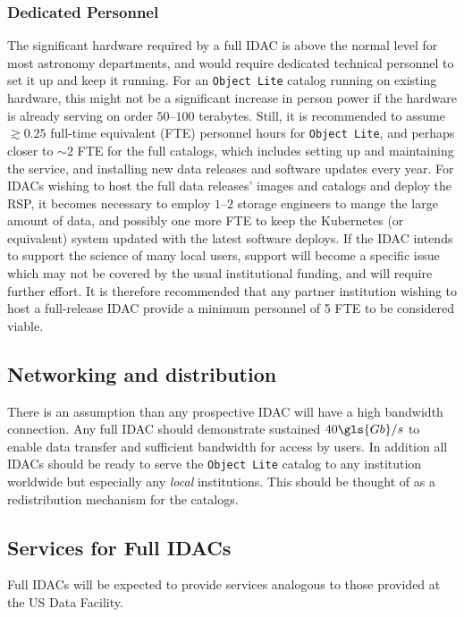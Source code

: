 \subsubsection{Dedicated Personnel}
The significant hardware required by a full  \gls{IDAC} is above the normal level for most astronomy departments, and would require dedicated technical personnel to set it up and keep it running. For an {\tt Object Lite} catalog running on existing hardware, this might not be a significant increase in person power if the hardware is already serving on order $50$--$100$ terabytes. Still, it is recommended to assume $\gtrsim0.25$ full-time equivalent (\gls{FTE}) personnel hours for {\tt Object Lite}, and perhaps closer to $\sim2$ \gls{FTE} for the full catalogs, which includes setting up and maintaining the service, and installing new data releases and software updates every year. For IDACs wishing to host the full data releases' images and catalogs and deploy the \gls{RSP}, it becomes necessary to employ $1$--$2$ storage engineers to mange the large amount of data, and possibly one more \gls{FTE} to keep the \gls{Kubernetes} (or equivalent) system updated with the latest software deploys. If the \gls{IDAC} intends to support the science of many local users, support will become a specific issue which may not be covered by the usual institutional funding, and will require further effort. It is therefore recommended that any partner institution wishing to host a full-release \gls{IDAC} provide a minimum personnel of 5 \gls{FTE} to be considered viable.

\subsection{Networking and distribution}
There is an assumption than any prospective \gls{IDAC} will have a high bandwidth connection.
Any full \gls{IDAC} should  demonstrate sustained $40 \gls{Gb}/s$ to enable data transfer and sufficient bandwidth for access by users.
In addition all IDACs should be ready  to serve the {\tt \gls{Object} Lite} catalog to any institution worldwide but especially any {\em local} institutions. This should be thought of as a redistribution mechanism for the catalogs.

\subsection{Services for Full IDACs}

Full IDACs will be expected to provide services analogous to those provided at the \gls{US} Data Facility.

